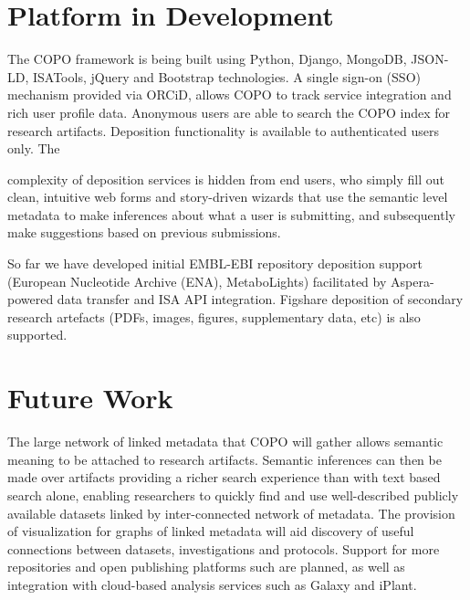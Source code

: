 \documentclass[runningheads,a4paper]{llncs}
\begin{document}
\vspace*{-0.1in}
\section{Platform in Development}

The COPO framework is being built using Python, Django, MongoDB,
JSON-LD, ISATools, jQuery and Bootstrap technologies. A single sign-on (SSO) mechanism provided via ORCiD, allows COPO to track
service integration and rich user profile data. Anonymous users are
able to search the COPO index for research artifacts. Deposition functionality is available to authenticated users only. The

complexity of deposition services is hidden from end users, who simply
fill out clean, intuitive web forms and story-driven wizards that use
the semantic level metadata to make inferences about what a user is
submitting, and subsequently make suggestions based on previous
submissions.

So far we have developed initial EMBL-EBI repository deposition
support (European Nucleotide Archive (ENA), MetaboLights) facilitated
by Aspera-powered data transfer and ISA API integration. Figshare
deposition of secondary research artefacts (PDFs, images, figures,
supplementary data, etc) is also supported.

\vspace*{-0.1in}
\section{Future Work}

The large network of linked metadata that COPO will gather allows
semantic meaning to be attached to research artifacts. Semantic
inferences can then be made over artifacts providing a richer search
experience than with text based search alone, enabling researchers
to quickly find and use well-described publicly available datasets
linked by inter-connected network of metadata. The provision of
visualization for graphs of linked metadata will aid discovery of
useful connections between datasets, investigations and
protocols. Support for more repositories and open publishing platforms
such are planned, as well as integration with cloud-based analysis services such as Galaxy
and iPlant.
\end{document}
